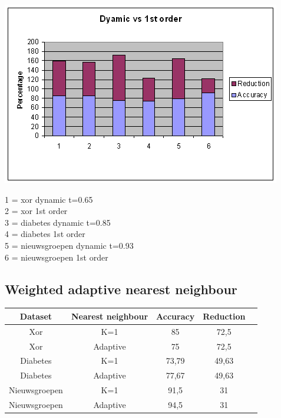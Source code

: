 \documentclass{article}
\begin{document}
\begin{center} \includegraphics[scale=0.7]{dynamic_vs_1storder} \end{center}
1 =	xor dynamic t=0.65\\
2 =	xor 1st order\\
3 =	diabetes dynamic t=0.85\\
4 =	diabetes 1st order\\
5 =	nieuwsgroepen dynamic t=0.93\\
6 =	nieuwsgroepen 1st order\\

\subsection{Weighted adaptive nearest neighbour}

\begin{tabular}{|c|c|c|c|c|}  \hline	
Dataset & Nearest neighbour & Accuracy &	Reduction \\ \hline
Xor & K=1	& 85 &	72,5 \\
Xor & Adaptive &	75 &	72,5 \\
Diabetes & K=1 &	73,79 &	49,63 \\
Diabetes & Adaptive & 	77,67 &	49,63 \\
Nieuwsgroepen & K=1 &	91,5 &	31 \\
Nieuwsgroepen & Adaptive &	94,5 &	31 \\ \hline
\end{tabular} \\
\end{document}
